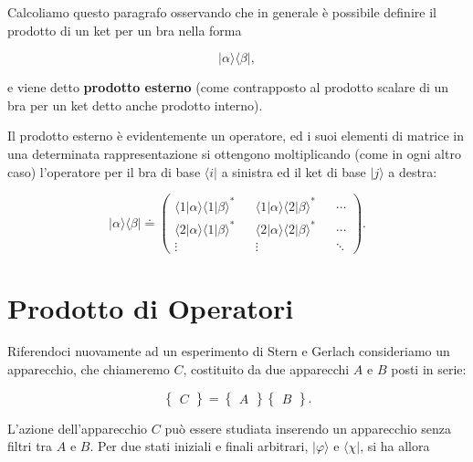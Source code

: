 Calcoliamo questo paragrafo osservando che in generale è possibile definire il prodotto di un ket per un bra nella forma

\begin{equation}
| \alpha \rangle \langle \beta |  ,
\end{equation}

e viene detto \textbf{prodotto esterno} (come contrapposto al prodotto scalare di un bra per un ket detto anche prodotto interno).

Il prodotto esterno è evidentemente un operatore, ed i suoi elementi di matrice in una determinata rappresentazione si ottengono moltiplicando (come in ogni altro caso) l'operatore per il bra di base $\langle i |$ a sinistra ed il ket di base $| j \rangle$ a destra:

\begin{equation}
| \alpha \rangle \langle \beta | \doteq
\begin{pmatrix}
\langle 1 | \alpha \rangle \langle 1 | \beta \rangle ^* && \langle 1 | \alpha \rangle \langle 2 | \beta \rangle ^* && \cdots \\
\langle 2 | \alpha \rangle \langle 1 | \beta \rangle ^* && \langle 2 | \alpha \rangle \langle 2 | \beta \rangle ^* &&  \cdots \\
\vdots && \vdots && \ddots
\end{pmatrix} .
\end{equation}

\section{Prodotto di Operatori}

Riferendoci nuovamente ad un esperimento di Stern e Gerlach consideriamo un apparecchio, che chiameremo $C$, costituito da due apparecchi $A$ e $B$ posti in serie:

\begin{equation}
\begin{Bmatrix}
C
\end{Bmatrix}=
\begin{Bmatrix}
A
\end{Bmatrix}
\begin{Bmatrix}
B
\end{Bmatrix} .
\end{equation}

L'azione dell'apparecchio $C$ può essere studiata inserendo un apparecchio senza filtri tra $A$ e $B$. Per due stati iniziali e finali arbitrari, $| \varphi \rangle $ e $\langle \chi |$, si ha allora

